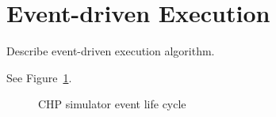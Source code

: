 
\section{Event-driven Execution}
\label{sec:exec}

Describe event-driven execution algorithm.  

See Figure~\ref{fig:event_exec}.

\begin{figure}[ht!]
\begin{center}
\caption{CHP simulator event life cycle}
\label{fig:event_exec}
\end{center}
\end{figure}

